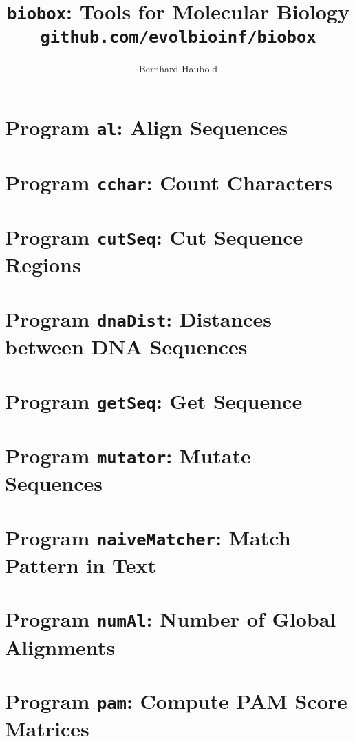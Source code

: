 \documentclass[a4paper]{report}
\begin{document}
\pagestyle{noweb}

\title{\texttt{biobox}: Tools for Molecular Biology\\
\small\texttt{github.com/evolbioinf/biobox}}
\author{Bernhard Haubold}
\maketitle
\tableofcontents

\chapter{Program \texttt{al}: Align Sequences}\label{ch:al}

\chapter{Program \texttt{cchar}: Count Characters}\label{ch:cch}

\chapter{Program \texttt{cutSeq}: Cut Sequence Regions}\label{ch:cut}

\chapter{Program \texttt{dnaDist}: Distances between DNA Sequences}\label{ch:dna}

\chapter{Program \texttt{getSeq}: Get Sequence}\label{ch:get}

\chapter{Program \texttt{mutator}: Mutate Sequences}\label{ch:mut}

\chapter{Program \texttt{naiveMatcher}: Match Pattern in
  Text}\label{ch:nm}

\chapter{Program \texttt{numAl}: Number of Global Alignments}\label{ch:num}

\chapter{Program \texttt{pam}: Compute PAM Score
  Matrices}\label{ch:pam}

\end{document}
